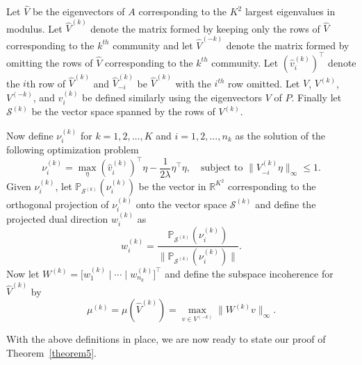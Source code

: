 \documentclass[12pt]{article}
\begin{document}
\begin{definition}
  \label{def:subspace_incoherence}
Let $\hat{V}$ be the eigenvectors of $A$
corresponding to the $K^2$ largest eigenvalues in modulus. Let
$\hat{V}^{(k)}$ denote the matrix formed by keeping only the rows of
$\hat{V}$ corresponding to the $k^{th}$
community and let $\hat{V}^{(-k)}$ denote the matrix formed by
omitting the rows of $\hat{V}$
corresponding to the $k^{th}$ community. Let $(\hat{v}_i^{(k)})^\top$ denote
the $i$th row of $\hat{V}^{(k)}$ and $\hat{V}_{-i}^{(k)}$ be $\hat{V}^{(k)}$ with
the $i^{th}$ row omitted. Let $V$, $V^{(k)}$, $V^{(-k)}$, and
$v_i^{(k)}$ be defined similarly using the eigenvectors $V$ of
$P$. Finally let $\mathcal{S}^{(k)}$ be the vector space spanned by the
rows of $V^{(k)}$. 

Now define $\nu_{i}^{(k)}$ for $k = 1,2,\dots,K$ and $i =
1,2,\dots,n_{k}$ as the solution of the following optimization problem
$$\nu_{i}^{(k)} = \max_\eta (\hat{v}_i^{(k)})^\top \eta - \frac{1}{2
  \lambda} \eta^\top \eta, \quad \text{subject to $\|V_{-i}^{(k)}
  \eta\|_\infty \leq 1$.}$$
Given $\nu_i^{(k)}$, let $\mathbb{P}_{\mathcal{S}^{(k)}}(\nu_i^{(k)})$
be the vector in $\mathbb{R}^{K^2}$ corresponding to the orthogonal projection of $\nu_i^{(k)}$ onto the vector space
$\mathcal{S}^{(k)}$ and define the projected dual direction $w_{i}^{(k)}$
as
$$w_i^{(k)} =
\frac{\mathbb{P}_{\mathcal{S}^{(k)}}(\nu_i^{(k)})}{\|\mathbb{P}_{\mathcal{S}^{(k)}}(\nu_i^{(k)})\|}.$$
Now let $W^{(k)} = \bigl[ w_1^{(k)} \mid \cdots \mid w_{n_k}^{(k)} \bigr]^\top$
and define the subspace incoherence for $\hat{V}^{(k)}$ by
$$\mu^{(k)} = \mu(\hat{V}^{(k)}) = \max\limits_{v \in V^{(-k)}} \|W^{(k)} v\|_\infty.$$
\end{definition}

With the above definitions in place, we are now ready to state our
proof of Theorem~\ref{theorem5}.
\end{document}
